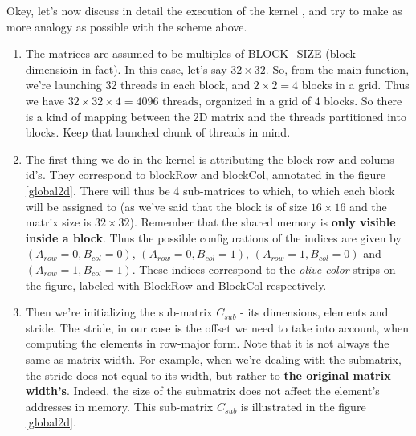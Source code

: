 {Okey, let's now discuss in detail the execution of the kernel \verb||, and try to make as more analogy as possible
with the scheme above.
\begin{enumerate}
   \item The matrices are assumed to be multiples of BLOCK\_SIZE (block dimensioin in fact). In this case, let's say $32\times 32$. So, 
   from the main function, we're launching 32 threads in each block, and $2\times 2 = 4$ blocks in a grid. Thus we have 
   $32\times 32\times 4=4096 \text{ threads}$, organized in a grid of 4 blocks. So there is a kind of mapping between 
   the 2D matrix and the threads partitioned into blocks.
   Keep that launched chunk of threads in mind. 
   \item The first thing we do in the kernel is attributing the block row and colums id's. They correspond to blockRow and blockCol, 
   annotated in the figure \ref{global2d}. There will thus be 4 sub-matrices to which, to which each block will be assigned to (as we've said 
   that the block is of size $16\times 16$ and the matrix size is $32\times 32$). Remember that
   the shared memory is \textbf{only visible inside a block}. Thus the possible configurations of the indices are given by 
   $(A_{row}=0, B_{col}=0)$, $(A_{row}=0, B_{col}=1)$, $(A_{row}=1, B_{col}=0)$ and $(A_{row}=1, B_{col}=1)$. These indices correspond to the 
   \textit{olive color} strips on the figure, labeled with BlockRow and BlockCol respectively.
   \item Then we're initializing the sub-matrix $C_{sub}$ - its dimensions, elements and stride.
    The stride, in our case is the offset we need to take into account, when computing the elements in row-major form. Note that it is not always
    the same as matrix width. For example, when we're dealing with the submatrix, the stride does not equal to its width, but rather to 
    \textbf{the original matrix width's}. Indeed, the size of the submatrix does not affect the element's addresses in memory.
    This sub-matrix $C_{sub}$ is illustrated in the figure \ref{global2d}. 



\end{enumerate}}
